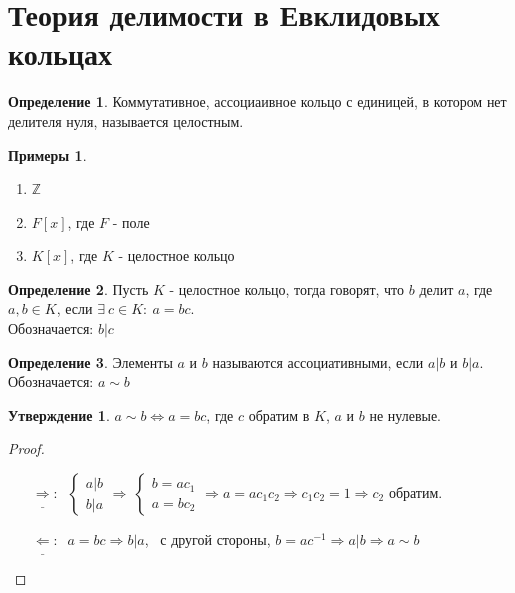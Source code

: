 \documentclass[a4paper, 12pt]{article}
\newcommand{\Z}{\mathbb Z}
\newcommand\tab[1][.5cm]{\hspace*{#1}}
\theoremstyle{definition}
\newtheorem*{definition}{Определение}
\newtheorem*{subtheorem}{Утверждение}
\newtheorem*{example}{Примеры}
\begin{document}
    \section{Теория делимости в Евклидовых кольцах}
    \begin{definition}
      Коммутативное, ассоциаивное кольцо с единицей, в котором нет делителя нуля, называется целостным.
    \end{definition}
    \begin{example}\tab
      \begin{enumerate}
        \item $\Z$
        \item $F[x]$, где $F$ - поле
        \item $K[x]$, где $K$ - целостное кольцо     
      \end{enumerate}
    \end{example}
    \begin{definition}
      Пусть $K$ - целостное кольцо, тогда говорят, что $b$ делит $a$, где $a,b \in K$, если $\exists \ c \in K: \ a = bc$.\\
      Обозначается: $b|c$ 
    \end{definition}
    \begin{definition}
      Элементы $a$ и $b$ называются ассоциативными, если $a|b$ и $b|a$.\\
      Обозначается: $a \sim  b$ 
    \end{definition}
    \begin{subtheorem}
      $a\sim b \Longleftrightarrow a = bc$, где $c$ обратим в $K$, $a$ и $b$ не нулевые.   
    \end{subtheorem}
    \begin{proof}\tab
      \begin{itemize}
        \item[$\underline{\Longrightarrow }: \ $] $\begin{cases}
          a|b\\
          b|a
        \end{cases} \Longrightarrow \ \begin{cases}
          b = ac_1\\
          a = bc_2
        \end{cases} \Longrightarrow a = ac_1c_2 \Longrightarrow c_1c_2 =1 \Longrightarrow c_2$ обратим.
        \item[$\underline{\Longleftarrow}: \ $] $a=bc \Longrightarrow b|a$, \ с другой стороны, $b = ac^{-1} \Longrightarrow  a|b \Longrightarrow a \sim b$ 
      \end{itemize}
    \end{proof}
\end{document}
